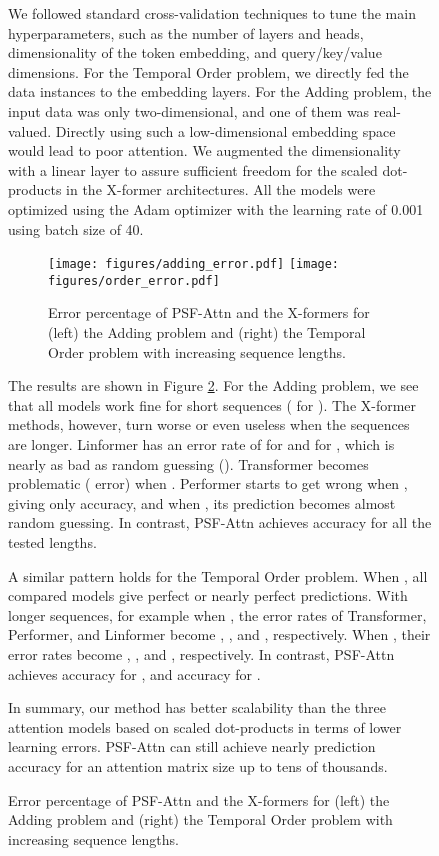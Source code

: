 \documentclass{article}
\begin{document}
\begin{figure}[t]
\begin{center}
We followed standard cross-validation techniques to tune the main hyperparameters, such as the number of layers and heads, dimensionality of the token embedding, and query/key/value dimensions. For the Temporal Order problem, we directly fed the data instances to the embedding layers. For the Adding problem, the input data was only two-dimensional, and one of them was real-valued. Directly using such a low-dimensional embedding space would lead to poor attention. We augmented the dimensionality with a linear layer to assure sufficient freedom for the scaled dot-products in the X-former architectures. All the models were optimized using the Adam optimizer \citep{adam} with the learning rate of 0.001 using batch size of 40.

\newcommand{\synfigwidth}{7.5cm}
\begin{figure}[t]
	\begin{center}
		\texttt{[image: figures/adding\_error.pdf]}\quad
		\texttt{[image: figures/order\_error.pdf]}
	\end{center}
    \centering
    \caption{Error percentage of PSF-Attn and the X-formers for (left) the Adding problem and (right) the Temporal Order problem with increasing sequence lengths.}
    \label{fig:synthetic}
    \vspace{-3mm}
\end{figure}




The results are shown in Figure \ref{fig:synthetic}. For the Adding problem, we see that all models work fine for short sequences ( for ). The X-former methods, however, turn worse or even useless when the sequences are longer. Linformer has an error rate of  for  and  for , which is nearly as bad as random guessing (). Transformer becomes problematic ( error) when . Performer starts to get wrong when , giving only  accuracy, and when , its prediction becomes almost random guessing. In contrast, PSF-Attn achieves  accuracy for all the tested lengths.

A similar pattern holds for the Temporal Order problem. When , all compared models give perfect or nearly perfect predictions. With longer sequences, for example when , the error rates of Transformer, Performer, and Linformer become , , and , respectively. When , their error rates become , , and , respectively. In contrast, PSF-Attn achieves  accuracy for , and  accuracy for .

In summary, our method has better scalability than the three attention models based on scaled dot-products in terms of lower learning errors. PSF-Attn can still achieve nearly  prediction accuracy for an attention matrix size up to tens of thousands.


\end{center}
\end{figure}
\end{document}
